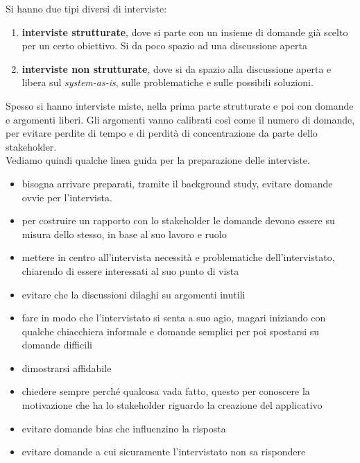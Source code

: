 Si hanno due tipi diversi di interviste:
\begin{enumerate}
  \item \textbf{interviste strutturate}, dove si parte con un insieme di domande già scelto per un certo obiettivo. Si da poco spazio ad una discussione aperta
  \item \textbf{interviste non strutturate}, dove si da spazio alla discussione aperta e libera sul \textit{system-as-is}, sulle problematiche e sulle possibili soluzioni. 
\end{enumerate}
Spesso si hanno interviste miste, nella prima parte strutturate e poi con domande e argomenti liberi. Gli argomenti vanno calibrati così come il numero di domande, per evitare perdite di tempo e di perdità di concentrazione da parte dello stakeholder.\\
Vediamo quindi qualche linea guida per la preparazione delle interviste.
\begin{itemize}
  \item bisogna arrivare preparati, tramite il background study, evitare domande ovvie per l'intervista.
  \item per costruire un rapporto con lo stakeholder le domande devono essere su  misura dello stesso, in base al suo lavoro e ruolo
  \item mettere in centro all'intervista necessità e problematiche dell'intervistato, chiarendo di essere interessati al suo punto di vista
  \item evitare che la discussioni dilaghi su argomenti inutili
  \item fare in modo che l'intervistato si senta a suo agio, magari iniziando con qualche chiacchiera informale e domande semplici per poi spostarsi su domande difficili
  \item dimostrarsi affidabile
  \item chiedere sempre perché qualcosa vada fatto, questo per conoscere la motivazione che ha lo stakeholder riguardo la creazione del applicativo
  \item evitare domande bias che influenzino la risposta
  \item evitare domande a cui sicuramente l'intervistato non sa rispondere
\end{itemize}

